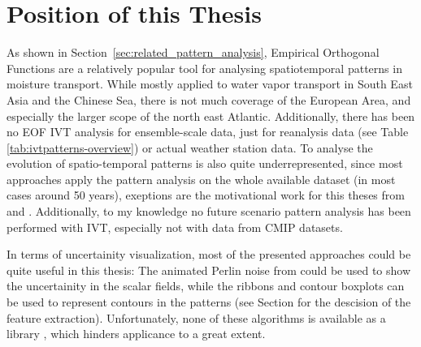 \section{Position of this Thesis} %
\label{sec:Position of this Thesis}

As shown in Section~\ref{sec:related_pattern_analysis}, Empirical Orthogonal Functions are a relatively popular tool for analysing spatiotemporal patterns in moisture transport. 
While mostly applied to water vapor transport in South East Asia and the Chinese Sea, there is not much coverage of the European Area, and especially the larger scope of the north east Atlantic. 
Additionally, there has been no EOF IVT analysis for ensemble-scale data, just for reanalysis data (see Table \ref{tab:ivtpatterns-overview}) or actual weather station data.
To analyse the evolution of spatio-temporal patterns is also quite underrepresented, since most approaches apply the pattern analysis on the whole available dataset (in most cases around 50 years), exeptions are the motivational work for this theses from \citeauthor{vietinghoff_visual_2021} and \cite{zou_interdecadal_2018}. 
Additionally, to my knowledge no future scenario pattern analysis has been performed with IVT, especially not with data from CMIP datasets.  

In terms of uncertainity visualization, most of the presented approaches could be quite useful in this thesis: The animated Perlin noise from \cite{coninx_visualization_2011} could be used to show the uncertainity in the scalar fields, while the ribbons and contour boxplots can be used to represent contours in the patterns (see Section  for the descision of the feature extraction). 
Unfortunately, none of these algorithms is available as a library , which hinders applicance to a great extent. 

